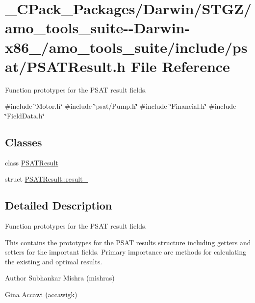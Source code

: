 \hypertarget{___c_pack___packages_2_darwin_2_s_t_g_z_2amo__tools__suite--_darwin-x86__64_2amo__tools__suite_2ebff217b422cb1d0ff6d2d9bd9f6ea65}{}\section{\+\_\+\+C\+Pack\+\_\+\+Packages/\+Darwin/\+S\+T\+G\+Z/amo\+\_\+tools\+\_\+suite-\/-\/\+Darwin-\/x86\+\_/amo\+\_\+tools\+\_\+suite/include/psat/\+P\+S\+A\+T\+Result.h File Reference}
\label{___c_pack___packages_2_darwin_2_s_t_g_z_2amo__tools__suite--_darwin-x86__64_2amo__tools__suite_2ebff217b422cb1d0ff6d2d9bd9f6ea65}


Function prototypes for the P\+S\+AT result fields.  


{\ttfamily \#include \char`\"{}Motor.\+h\char`\"{}}\newline
{\ttfamily \#include \char`\"{}psat/\+Pump.\+h\char`\"{}}\newline
{\ttfamily \#include \char`\"{}Financial.\+h\char`\"{}}\newline
{\ttfamily \#include \char`\"{}Field\+Data.\+h\char`\"{}}\newline
\subsection*{Classes}
\begin{DoxyCompactItemize}
\item 
class \hyperlink{class_p_s_a_t_result}{P\+S\+A\+T\+Result}
\item 
struct \hyperlink{struct_p_s_a_t_result_1_1result__}{P\+S\+A\+T\+Result\+::result\+\_\+}
\end{DoxyCompactItemize}


\subsection{Detailed Description}
Function prototypes for the P\+S\+AT result fields. 

This contains the prototypes for the P\+S\+AT results structure including getters and setters for the important fields. Primary importance are methods for calculating the existing and optimal results.

\begin{DoxyAuthor}{Author}
Subhankar Mishra (mishras) 

Gina Accawi (accawigk) 
\end{DoxyAuthor}
